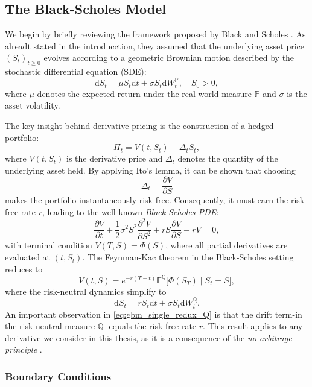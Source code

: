 \documentclass[12pt]{report} %
\theoremstyle{plain} %
\theoremstyle{definition} %
\theoremstyle{remark} %
\begin{document}
\subsection{The Black-Scholes Model}\label{sec:bs_dynamics}

We begin by briefly reviewing the framework proposed by Black and Scholes \cite{black1973}. As alreadt stated in the introducction, they assumed that the
underlying asset price $(S_t)_{t\ge0}$ evolves according to a geometric Brownian motion described by the stochastic
differential equation (SDE):
\begin{equation}\label{eq:gbm_single_redux}
\mathrm{d}S_t = \mu S_t\mathrm{d}t + \sigma S_t\mathrm{d}W^{\mathbb{P}}_t,\quad S_0>0,
\end{equation}
where $\mu$ denotes the expected return under the real-world measure $\mathbb{P}$ and $\sigma$ is the asset volatility.

The key insight behind derivative pricing is the construction of a hedged portfolio:
\[
\Pi_t = V(t,S_t) - \Delta_t S_t,
\]
where $V(t,S_t)$ is the derivative price and $\Delta_t$ denotes the quantity of the underlying asset held.
By applying Ito's lemma, it can be shown that choosing
\[
\Delta_t = \frac{\partial V}{\partial S}
\]
makes the portfolio instantaneously risk-free. Consequently, it must earn the risk-free rate $r$, leading to the
well-known \emph{Black-Scholes PDE}:
\begin{equation}\label{eq:BS_complete}
\frac{\partial V}{\partial t} + \frac{1}{2}\sigma^{2}S^{2}\frac{\partial^{2}V}{\partial S^{2}} + rS\frac{\partial V}{\partial S} - rV = 0,
\end{equation}
with terminal condition $V(T,S)=\Phi(S)$, where all partial derivatives are evaluated at $(t,S_t)$. 
The Feynman-Kac theorem in the Black-Scholes setting reduces to
\[
V(t,S) = e^{-r(T-t)}\mathbb{E}^{\mathbb{Q}}\bigl[\Phi(S_T)\mid S_t=S\bigr],
\]
where the risk-neutral dynamics simplify to
\begin{equation}\label{eq:gbm_single_redux_Q}
	\mathrm{d}S_t = r S_t\mathrm{d}t + \sigma S_t\mathrm{d}W^{\mathbb{Q}}_t.
\end{equation}
An important observation in \eqref{eq:gbm_single_redux_Q} is that the drift term-in the risk-neutral measure $\mathbb{Q}$-
equals the risk-free rate $r$. This result applies to any derivative
we consider in this thesis, as it is a consequence of the
\emph{no-arbitrage principle} \cite{björk2004arbitrage}.

\subsubsection{Boundary Conditions}
\end{document}
